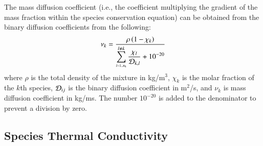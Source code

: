 \documentclass{warpdoc}
\newcommand{\rhos}{\rho}
\newcommand{\ns}{{{n}_{\rm s}}}
\newcommand{\mfa}{\scriptscriptstyle}
\newcommand{\mfd}{\displaystyle}
\begin{document}
The mass diffusion coefficient (i.e., the coefficient multiplying the gradient of the mass fraction within the species conservation equation) can be obtained from the binary diffusion coefficients from the following:
%
\begin{equation}
\mfd\nu_k= \frac{\rhos \left( 1 - {\chi}_k \right)}
            {\mfd\sum_{\mfa l=1..\ns}^{l \neq k} \frac{{\chi}_l}{{\cal D}_{k,l}} +10^{-20}   }
\end{equation}
%
where $\rho$ is the total density of the mixture in kg/m$^3$, $\chi_k$ is the molar fraction of the $k$th species, ${\cal D}_{ij}$ is the binary diffusion coefficient in m$^2$/s, and $\nu_k$ is mass diffusion coefficient in kg/ms. The number $10^{-20}$ is added to the denominator to prevent a division by zero.


\subsection{Species Thermal Conductivity}
\end{document}
